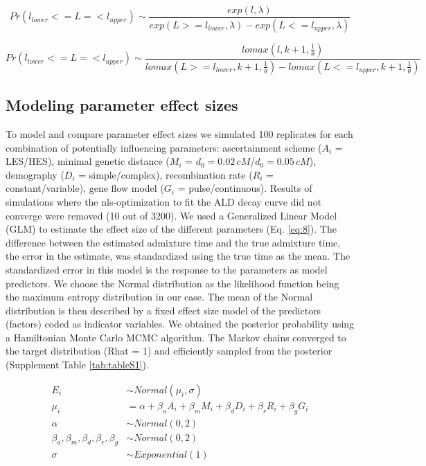 \documentclass[]{article}
\begin{document}
\begin{equation}
\label{eq:7}
Pr(l_{lower}<=L=<l_{upper}) \sim \frac{exp(l,\lambda)}{exp(L>=l_{lower},\lambda)-exp(L<=l_{upper},\lambda)}
\end{equation}

\begin{equation}
\label{eq:8}
Pr(l_{lower}<=L=<l_{upper}) \sim \frac{lomax(l,k+1,\frac{1}\theta)}{lomax(L>=l_{lower},k+1,\frac{1}\theta)-lomax(L<=l_{upper},k+1,\frac{1}\theta)}
\end{equation}

\subsection{Modeling parameter effect sizes}\label{modeling prameter effect sizes}

To model and compare parameter effect sizes we simulated 100
replicates for each combination of potentially influencing
parameters: ascertainment scheme ($A_i$ = LES/HES), minimal genetic distance
($M_i$ = \(d_{0}=0.02\,cM\)/\(d_{0}=0.05\,cM\)), demography ($D_i$ = simple/complex),
recombination rate ($R_i$ = constant/variable), gene flow model
($G_i$ = pulse/continuous). Results of simulations where the nls-optimization to
fit the ALD decay curve did not converge were removed (10 out of 3200).
We used a Generalized Linear Model (GLM)  to estimate the effect
size of the different parameters (Eq.
\ref{eq:8}). The difference between the estimated
admixture time and the true admixture time, the error in the estimate,
was standardized using the true time as the mean. The standardized error in this model is the response to the parameters as model
predictors. We choose the Normal distribution as the likelihood function being the maximum entropy distribution in our case. The mean of the Normal distribution is then described by a fixed effect size model of the predictors (factors) coded as indicator variables. We obtained the posterior probability using a Hamiltonian Monte Carlo MCMC algorithm. The Markov chains converged to the target distribution (Rhat = 1) and efficiently sampled from the posterior (Supplement Table \ref{tab:tableS1}).  

\begin{equation}\label{eq:8}
\begin{split}
E_i &\sim Normal(\mu_i,\sigma) \\
\mu_i &= \alpha + \beta_aA_i + \beta_mM_i + \beta_dD_i + \beta_rR_i + \beta_gG_i \\
\alpha &\sim Normal(0,2) \\
\beta_a,\beta_m,\beta_d,\beta_r,\beta_g &\sim Normal(0,2) \\
\sigma &\sim Exponential(1)
\end{split}
\end{equation}
\end{document}
